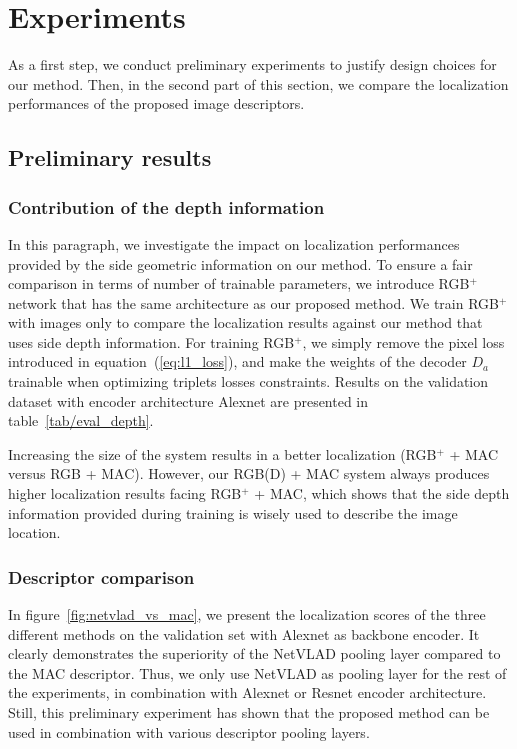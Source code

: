 \section{Experiments}
\label{sec:experiments}

As a first step, we conduct preliminary experiments to justify design choices for our method. Then, in the second part of this section, we compare the localization performances of the proposed image descriptors.

\subsection{Preliminary results}

\subsubsection{Contribution of the depth information}

In this paragraph, we investigate the impact on localization performances provided by the side geometric information on our method. To ensure a fair comparison in terms of number of trainable parameters, we introduce RGB$^+$ network that has the same architecture as our proposed method. We train RGB$^+$ with images only to compare the localization results against our method that uses side depth information. For training RGB$^+$, we simply remove the pixel loss introduced in equation~(\ref{eq:l1_loss}), and make the weights of the decoder $D_a$ trainable when optimizing triplets losses constraints. Results on the validation dataset with encoder architecture Alexnet are presented in table~\ref{tab/eval_depth}.

Increasing the size of the system results in a better localization (RGB$^{+}$ + MAC versus RGB + MAC). However, our RGB(D) + MAC system always produces higher localization results facing RGB$^{+}$ + MAC, which shows that the side depth information provided during training is wisely used to describe the image location.

\subsubsection{Descriptor comparison}

In figure~\ref{fig:netvlad_vs_mac}, we present the localization scores of the three different methods on the validation set with Alexnet as backbone encoder. It clearly demonstrates the superiority of the NetVLAD pooling layer compared to the MAC descriptor. Thus, we only use NetVLAD as pooling layer for the rest of the experiments, in combination with Alexnet or Resnet encoder architecture. Still, this preliminary experiment has shown that the proposed method can be used in combination with various descriptor pooling layers.

